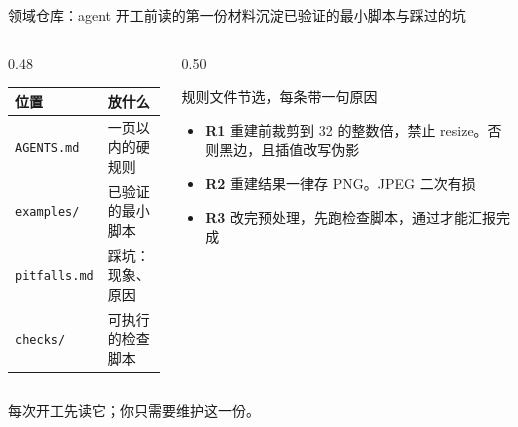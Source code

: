 \documentclass[aspectratio=169]{beamer}
\begin{document}
\begin{frame}{领域仓库：agent 开工前读的第一份材料}{沉淀已验证的最小脚本与踩过的坑}
  \begin{columns}[T]
    \begin{column}{0.48\textwidth}
      \footnotesize
      \begin{tabular}{ll}
        \toprule
        \textbf{位置} & \textbf{放什么} \\
        \midrule
        \texttt{AGENTS.md} & 一页以内的硬规则 \\
        \texttt{examples/} & 已验证的最小脚本 \\
        \texttt{pitfalls.md} & 踩坑：现象、原因 \\
        \texttt{checks/} & 可执行的检查脚本 \\
        \bottomrule
      \end{tabular}
    \end{column}
    \begin{column}{0.50\textwidth}
      \begin{block}{规则文件节选，每条带一句原因}
        \small
        \begin{itemize}
          \item \textbf{R1} 重建前裁剪到 32 的整数倍，禁止 resize。否则黑边，且插值改写伪影
          \item \textbf{R2} 重建结果一律存 PNG。JPEG 二次有损
          \item \textbf{R3} 改完预处理，先跑检查脚本，通过才能汇报完成
        \end{itemize}
      \end{block}
    \end{column}
  \end{columns}
  \begin{center}
  \textcolor{soft}{\small 每次开工先读它；你只需要维护这一份。}
  \end{center}
\end{frame}
\end{document}
